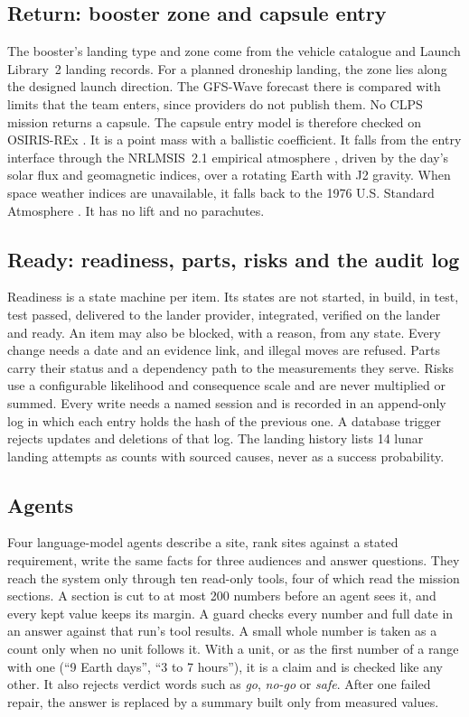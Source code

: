 \documentclass[11pt,a4paper]{article}
\begin{document}
\subsection{Return: booster zone and capsule entry}

The booster's landing type and zone come from the vehicle catalogue and Launch Library~2
landing records. For a planned droneship landing, the zone lies along the designed launch
direction. The GFS-Wave forecast there is compared with limits that the team enters, since
providers do not publish them. No CLPS mission returns a capsule. The capsule entry model
is therefore checked on OSIRIS-REx \citep{lauretta2017}. It is a point mass with a ballistic
coefficient. It falls from the entry interface through the NRLMSIS~2.1 empirical atmosphere
\citep{emmert2022}, driven by the day's solar flux and geomagnetic indices, over a rotating
Earth with J2 gravity. When space weather indices are unavailable, it falls back to the 1976
U.S. Standard Atmosphere \citep{ussa1976}. It has no lift and no parachutes.

\subsection{Ready: readiness, parts, risks and the audit log}

Readiness is a state machine per item. Its states are not started, in build, in test, test passed, delivered to the lander provider, integrated, verified on the lander and ready. An item may also be blocked, with a reason, from any state. Every change needs a date and an evidence link,
and illegal moves are refused. Parts carry their status and a dependency path to the
measurements they serve. Risks use a configurable likelihood and consequence scale and
are never multiplied or summed. Every write needs a named session and is recorded in an
append-only log in which each entry holds the hash of the previous one. A database
trigger rejects updates and deletions of that log. The landing history lists 14 lunar
landing attempts as counts with sourced causes, never as a success probability.

\subsection{Agents}
\label{sec:agents}

Four language-model agents describe a site, rank sites against a stated requirement,
write the same facts for three audiences and answer questions. They reach
the system only through ten read-only tools, four of which read the mission sections. A
section is cut to at most 200 numbers before an agent sees it, and every kept value keeps
its margin. A guard checks every number and full date in an answer against that run's
tool results. A small whole number is taken as a count only when no unit follows it. With a
unit, or as the first number of a range with one (``9 Earth days'', ``3 to 7 hours''), it is a
claim and is checked like any other. It also rejects verdict words such as \emph{go}, \emph{no-go} or
\emph{safe}. After one failed repair, the answer is replaced by a summary built only from
measured values.
\end{document}
